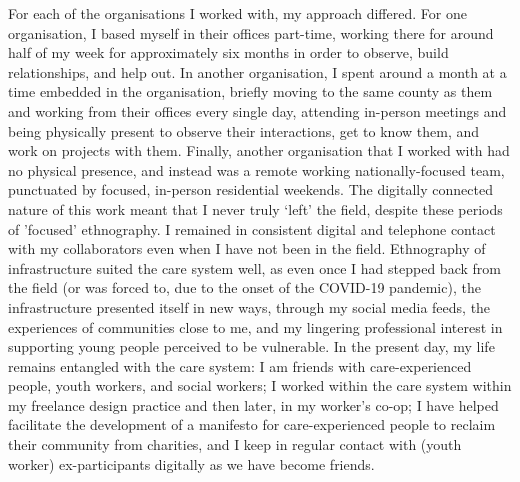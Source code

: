 For each of the organisations I worked with, my approach differed. For one organisation, I based myself in their offices part-time, working there for around half of my week for approximately six months in order to observe, build relationships, and help out. In another organisation, I spent around a month at a time embedded in the organisation, briefly moving to the same county as them and working from their offices every single day, attending in-person meetings and being physically present to observe their interactions, get to know them, and work on projects with them. Finally, another organisation that I worked with had no physical presence, and instead was a remote working nationally-focused team, punctuated by focused, in-person residential weekends. The digitally connected nature of this work meant that I never truly ‘left’ the field, despite these periods of 'focused' ethnography. I remained in consistent digital and telephone contact with my collaborators even when I have not been in the field. Ethnography of infrastructure suited the care system well, as even once I had stepped back from the field (or was forced to, due to the onset of the COVID-19 pandemic), the infrastructure presented itself in new ways, through my social media feeds, the experiences of communities close to me, and my lingering professional interest in supporting young people perceived to be vulnerable. In the present day, my life remains entangled with the care system: I am friends with care-experienced people, youth workers, and social workers; I worked within the care system within my freelance design practice and then later, in my worker's co-op; I have helped facilitate the development of a manifesto for care-experienced people to reclaim their community from charities, and I keep in regular contact with (youth worker) ex-participants digitally as we have become friends. 


